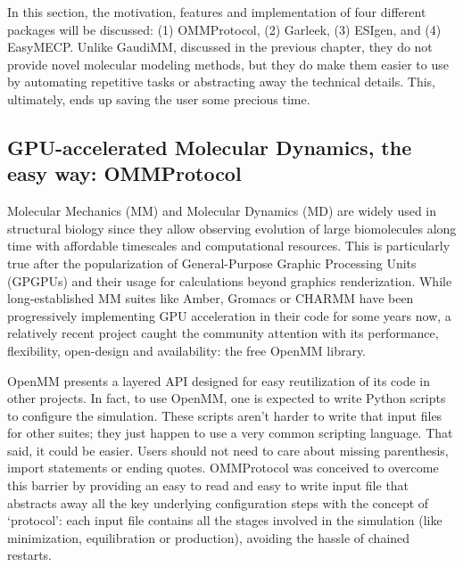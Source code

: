 In this section, the motivation, features and implementation of four different packages will be discussed: (1) OMMProtocol, (2) Garleek, (3) ESIgen, and (4) EasyMECP. Unlike GaudiMM, discussed in the previous chapter, they do not provide novel molecular modeling methods, but they do make them easier to use by automating repetitive tasks or abstracting away the technical details. This, ultimately, ends up saving the user some precious time.


\subsection{GPU-accelerated Molecular Dynamics, the easy way: OMMProtocol}

Molecular Mechanics (MM) and Molecular Dynamics (MD) are widely used in structural biology since they allow observing evolution of large biomolecules along time with affordable timescales and computational resources. This is particularly true after the popularization of General-Purpose Graphic Processing Units (GPGPUs) and their usage for calculations beyond graphics renderization. While long-established MM suites like Amber,\cite{amber} Gromacs\cite{gromacs} or CHARMM\cite{brooks1983} have been progressively implementing GPU acceleration in their code for some years now, a relatively recent project caught the community attention with its performance, flexibility, open-design and availability: the free OpenMM library.\cite{openmm}

OpenMM presents a layered API designed for easy reutilization of its code in other projects. In fact, to use OpenMM, one is expected to write Python scripts to configure the simulation. These scripts aren’t harder to write that input files for other suites; they just happen to use a very common scripting language. That said, it could be easier. Users should not need to care about missing parenthesis, import statements or ending quotes. OMMProtocol was conceived to overcome this barrier by providing an easy to read and easy to write input file that abstracts away all the key underlying configuration steps with the concept of ‘protocol’: each input file contains all the stages involved in the simulation (like minimization, equilibration or production), avoiding the hassle of chained restarts.

